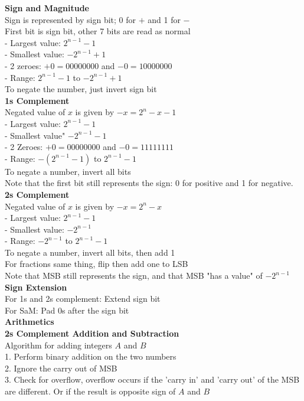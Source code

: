 \documentclass[10pt, a4paper]{article}
\begin{document}
\begin{multicols*}{3}
		\textbf{Sign and Magnitude}\\
		Sign is represented by sign bit; 0 for $+$ and 1 for $-$\\
		First bit is sign bit, other 7 bits are read as normal\\
		- Largest value: $2^{n - 1} - 1$\\
		- Smallest value: $-2^{n - 1} + 1$\\		
		- 2 zeroes: $+0 = 00000000$ and $-0 = 10000000$\\
		- Range: $2^{n - 1} - 1$ to $-2^{n - 1} + 1$\\
		To negate the number, just invert sign bit\\
		
		\textbf{1s Complement}\\
		Negated value of $x$ is given by $-x = 2^n - x - 1$\\
		- Largest value: $2^{n - 1} - 1$\\
		- Smallest value" $- 2^{n - 1} - 1$\\
		- 2 Zeroes: $+0 = 00000000$ and $-0 = 11111111$\\
		- Range: $-(2^{n - 1} - 1)$ to $2^{n - 1} - 1$\\
		To negate a number, invert all bits\\
		Note that the first bit still represents the sign: 0 for positive and 1 for negative.\\
		
		\textbf{2s Complement}\\
		Negated value of $x$ is given by $-x = 2^n - x$\\
		- Largest value: $2^{n - 1} - 1$\\
		- Smallest value: $-2^{n - 1}$\\
		- Range: $-2^{n - 1}$ to $2^{n - 1} - 1$\\
		To negate a number, invert all bits, then add 1\\
		For fractions same thing, flip then add one to LSB\\
		Note that MSB still represents the sign, and that MSB "has a value" of $-2^{n - 1}$\\
		
		\textbf{Sign Extension}\\
		For 1s and 2s complement: Extend sign bit\\
		For SaM: Pad 0s after the sign bit\\
		
		\textbf{Arithmetics}\\
		\textbf{2s Complement Addition and Subtraction}\\
		Algorithm for adding integers $A$ and $B$\\
		1. Perform binary addition on the two numbers\\
		2. Ignore the carry out of MSB\\
		3. Check for overflow, overflow occurs if the 'carry in' and 'carry out' of the MSB are different. Or if the result is opposite sign of $A$ and $B$\\
		

\end{multicols*}
\end{document}
